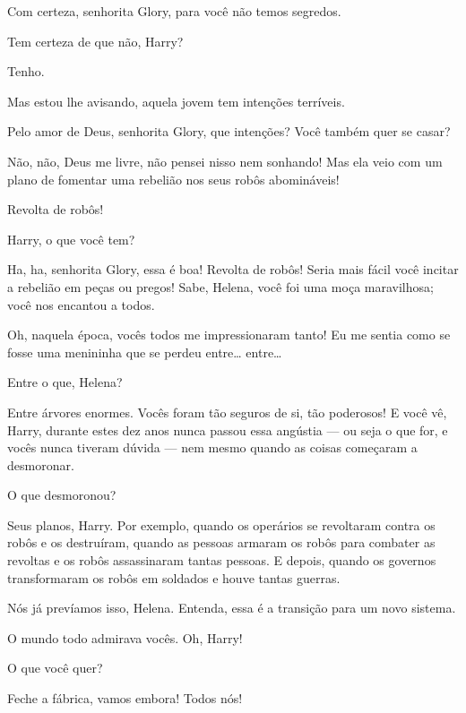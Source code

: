  Com certeza, senhorita Glory, para você não temos segredos.

  Tem certeza de que não, Harry?

 Tenho.

  Mas estou lhe avisando, aquela jovem
tem intenções terríveis.

 Pelo amor de Deus, senhorita Glory, que intenções? Você também quer se casar?

 Não, não, Deus me livre, não pensei nisso nem sonhando! Mas ela veio com
um plano de fomentar uma rebelião nos seus robôs abomináveis!

  Revolta de robôs!

  Harry, o que você tem?

 Ha, ha, senhorita Glory, essa é boa! Revolta de robôs! Seria mais fácil
você incitar a rebelião em peças ou pregos!  Sabe, Helena, você foi uma
moça maravilhosa; você nos encantou a todos.

  Oh, naquela época, vocês todos me
impressionaram tanto! Eu me sentia como se fosse uma menininha que se perdeu
entre\ldots{} entre\ldots{}

 Entre o que, Helena?

 Entre árvores enormes. Vocês foram tão seguros de si, tão poderosos! E
você vê, Harry, durante estes dez anos nunca passou essa angústia --- ou seja o
que for, e vocês nunca tiveram dúvida --- nem mesmo quando as coisas começaram a
desmoronar.

 O que desmoronou?

 Seus planos, Harry. Por exemplo, quando os operários se revoltaram
contra os robôs e os destruíram, quando as pessoas armaram os robôs para
combater as revoltas e os robôs assassinaram tantas pessoas. E depois, quando  os
governos transformaram os robôs em soldados e houve tantas guerras.

  Nós já prevíamos isso, Helena. Entenda,
essa é a transição para um novo sistema.

 O mundo todo admirava vocês.  Oh, Harry!

 O que você quer?

  Feche a fábrica, vamos embora! Todos nós!

